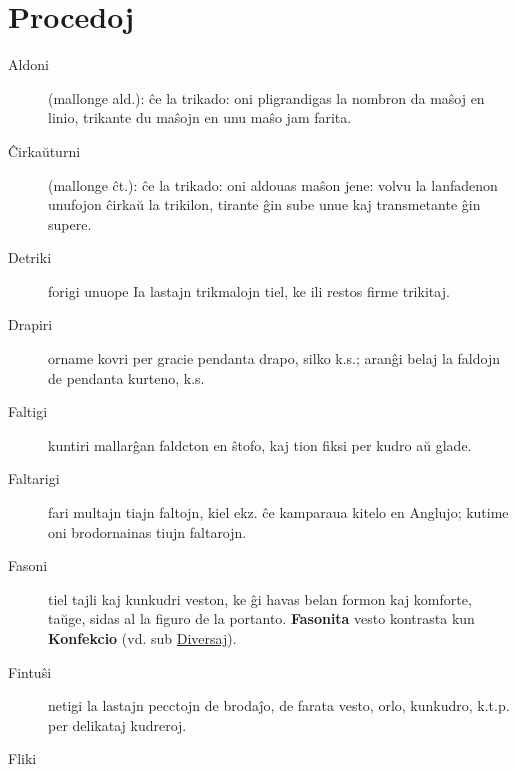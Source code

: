 \section[Procedoj]{Procedoj}
\hypertarget{Procedoj}{}
\label{Procedoj}


\begin{description}
\item[Aldoni]

 (mallonge ald.): ĉe la trikado: oni pligrandigas la nombron da maŝoj en linio, trikante du maŝojn en unu maŝo jam farita.

\item[Ĉirkaŭturni]

 (mallonge ĉt.): ĉe la trikado: oni aldouas maŝon jene: volvu la lanfadenon unufojon ĉirkaŭ la trikilon, tirante ĝin sube unue kaj transmetante ĝin supere.

\item[Detriki]

 forigi unuope Ia lastajn trikmalojn tiel, ke ili restos firme trikitaj.

\item[Drapiri]

 orname kovri per gracie pendanta drapo, silko k.s.; aranĝi belaj la faldojn de pendanta kurteno, k.s.

\item[Faltigi]

 kuntiri mallarĝan faldcton en ŝtofo, kaj tion fiksi per kudro aŭ glade.

\item[Faltarigi]

 fari multajn tiajn faltojn, kiel ekz. ĉe kamparaua kitelo en Anglujo; kutime oni brodornainas tiujn faltarojn.

\item[Fasoni]

 tiel tajli kaj kunkudri veston, ke ĝi havas belan formon kaj komforte, taŭge, sidas al la figuro de la portanto. \textbf{Fasonita} vesto kontrasta kun \textbf{Konfekcio} (vd. sub \hyperlink{Diversaj}{Diversaj}).

\item[Fintuŝi]

 netigi la lastajn pecctojn de brodaĵo, de farata vesto, orlo, kunkudro, k.t.p. per delikataj kudreroj.

\item[Fliki]


\end{description}
